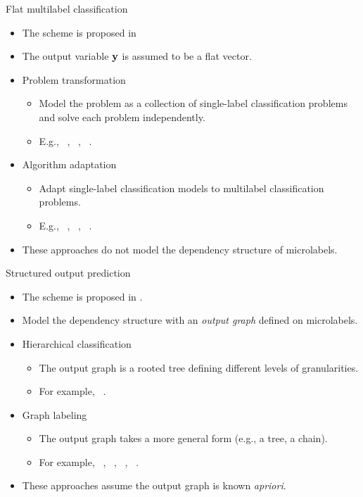 \documentclass[first=dgreen,second=purple,logo=yellowexc]{aaltoslides}
\begin{document}
%
\begin{frame}{Flat multilabel classification}
	\begin{itemize}\footnotesize
		\item The scheme is proposed in \cite{Tsoumakas10mining}
		\item The output variable $\mathbf {y}$ is assumed to be a flat vector.
		\item Problem transformation
		\begin{itemize}\footnotesize
			\item Model the problem as a collection of single-label classification problems and solve each problem independently.
			\item E.g., \mlknn\ \cite{Zhang07mlknn}, \cc\ \cite{Read11classifier}, \iblr\ \cite{Cheng09combining}.
		\end{itemize}
		\item Algorithm adaptation 
		\begin{itemize}\footnotesize
			\item Adapt single-label classification models to multilabel classification problems.
			\item E.g., \corrlog\ \cite{Bian12corrlog}, \mtl\ \cite{Argyriou08convex}, \adaboostmh\ \cite{Schapire99improved,Esuli2008boosting}.
		\end{itemize}
		\item These approaches do not model the dependency structure of microlabels.
	\end{itemize}
\end{frame}

%
\begin{frame}{Structured output prediction}
	\begin{itemize}\footnotesize
		\item The scheme is proposed in \cite{Su2014Multilabel}.
		\item Model the dependency structure with an {\em output graph} defined on microlabels.
		\item Hierarchical classification
		\begin{itemize}\footnotesize
			\item The output graph is a rooted tree defining different levels of granularities.
			\item For example, \svmstruct\ \cite{THJA04,TJTA05}.
		\end{itemize}
		\item Graph labeling
		\begin{itemize}\footnotesize
			\item The output graph takes a more general form (e.g., a tree, a chain).
			\item For example, \crf\ \cite{lafferty01,taskar02}, \mmmn\ \cite{Taskar04max}, \mmcrf\ \cite{Rousu07, su10structured}, \spin\ \cite{su14structured}.
		\end{itemize}
		\item These approaches assume the output graph is known {\em apriori}.
	\end{itemize}
\end{frame}
\end{document}
